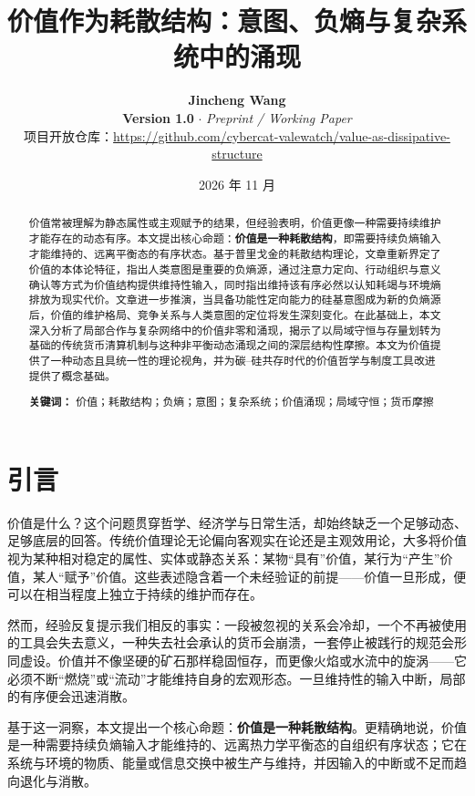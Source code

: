 \documentclass[11pt,a4paper]{ctexart}
\title{\LARGE \textbf{价值作为耗散结构：意图、负熵与复杂系统中的涌现}}
\author{
    \textbf{Jincheng Wang}\\[0.3em]
    \small \textbf{Version 1.0} \quad $\cdot$ \quad \textit{Preprint / Working Paper}\\[0.2em]
    \small 项目开放仓库：\href{https://github.com/cybercat-valewatch/value-as-dissipative-structure}{https://github.com/cybercat-valewatch/value-as-dissipative-structure}
}
\date{2026 年 11 月}
\begin{document}
\maketitle

\begin{abstract}
价值常被理解为静态属性或主观赋予的结果，但经验表明，价值更像一种需要持续维护才能存在的动态有序。本文提出核心命题：\textbf{价值是一种耗散结构}，即需要持续负熵输入才能维持的、远离平衡态的有序状态。基于普里戈金的耗散结构理论，文章重新界定了价值的本体论特征，指出人类意图是重要的负熵源，通过注意力定向、行动组织与意义确认等方式为价值结构提供维持性输入，同时指出维持该有序必然以认知耗竭与环境熵排放为现实代价。文章进一步推演，当具备功能性定向能力的硅基意图成为新的负熵源后，价值的维护格局、竞争关系与人类意图的定位将发生深刻变化。在此基础上，本文深入分析了局部合作与复杂网络中的价值非零和涌现，揭示了以局域守恒与存量划转为基础的传统货币清算机制与这种非平衡动态涌现之间的深层结构性摩擦。本文为价值提供了一种动态且具统一性的理论视角，并为碳--硅共存时代的价值哲学与制度工具改进提供了概念基础。

\vspace{0.8em}
\noindent \textbf{关键词：} 价值；耗散结构；负熵；意图；复杂系统；价值涌现；局域守恒；货币摩擦
\end{abstract}

\vspace{1.2em}

\section{引言}

价值是什么？这个问题贯穿哲学、经济学与日常生活，却始终缺乏一个足够动态、足够底层的回答。传统价值理论无论偏向客观实在论还是主观效用论，大多将价值视为某种相对稳定的属性、实体或静态关系：某物“具有”价值，某行为“产生”价值，某人“赋予”价值。这些表述隐含着一个未经验证的前提——价值一旦形成，便可以在相当程度上独立于持续的维护而存在。

然而，经验反复提示我们相反的事实：一段被忽视的关系会冷却，一个不再被使用的工具会失去意义，一种失去社会承认的货币会崩溃，一套停止被践行的规范会形同虚设。价值并不像坚硬的矿石那样稳固恒存，而更像火焰或水流中的旋涡——它必须不断“燃烧”或“流动”才能维持自身的宏观形态。一旦维持性的输入中断，局部的有序便会迅速消散。

基于这一洞察，本文提出一个核心命题：\textbf{价值是一种耗散结构}。更精确地说，价值是一种需要持续负熵输入才能维持的、远离热力学平衡态的自组织有序状态；它在系统与环境的物质、能量或信息交换中被生产与维持，并因输入的中断或不足而趋向退化与消散。
\end{document}
